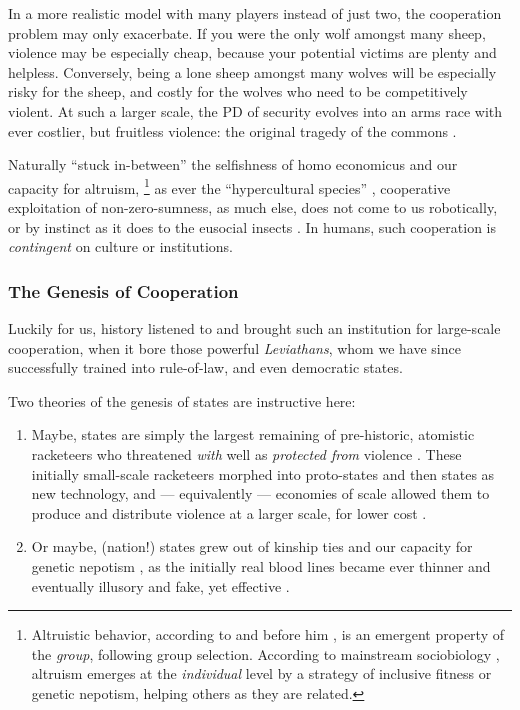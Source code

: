 In a more realistic model with many players instead of just two, the cooperation problem may only exacerbate.
If you were the only wolf amongst many sheep, violence may be especially cheap, because your potential victims are plenty and helpless.
Conversely, being a lone sheep amongst many wolves will be especially risky for the sheep, and costly for the wolves who need to be competitively violent.
At such a larger scale, the \gls{PD} of security evolves into an arms race with ever costlier, but fruitless violence:
the original tragedy of the commons \citep{Hardin-1968-aa}.

Naturally ``stuck in-between'' \citep{Lehrer2012} the selfishness of homo economicus and our capacity for altruism,
\footnote{
	Altruistic behavior, according to \cite{Wilson2012} and before him \cite{Darwin1859}, is an emergent property of the \emph{group}, following group selection.
	According to mainstream sociobiology \citep[and initially][]{Wilson1975}, altruism emerges at the \emph{individual} level by a strategy of inclusive fitness or genetic nepotism, helping others as they are related.
}
as ever the ``hypercultural species'' \citep[K175]{Henrich2007}, cooperative exploitation of non-zero-sumness, as much else, does not come to us robotically, or by instinct as it does to the eusocial insects \citep{Wilson2012}.
In humans, such cooperation is \emph{contingent} on culture or institutions.

\subsubsection{The Genesis of Cooperation}
Luckily for us, history listened to \citeauthor{Hobbes-1651-aa} and brought such an institution for large-scale cooperation, when it bore those powerful \emph{Leviathans}, whom we have since successfully trained into rule-of-law, and even democratic states.

Two theories of the genesis of states are instructive here:
\begin{enumerate}
	\item
	Maybe, states are simply the largest remaining of pre-historic, atomistic racketeers who threatened \emph{with} well as \emph{protected from} violence \citep[182]{Tilly-1985-aa}.
	These initially small-scale racketeers morphed into proto-states and then states as new technology, and --- equivalently --- economies of scale allowed them to produce and distribute violence at a larger scale, for lower cost \citep{Tilly-1985-aa}.

	\item
	Or maybe, (nation!) states grew out of kinship ties and our capacity for genetic nepotism \citep{Hamilton1964,Axelrod1981a}, as the initially real blood lines became ever thinner and eventually illusory and fake, yet effective \citep{Van-den-Berghe-1981-aa,Gellner-1983-aa}.
\end{enumerate}

